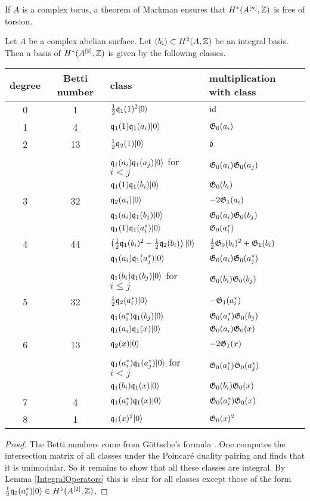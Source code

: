 \begin{remark}
If $A$ is a complex torus, a theorem of Markman \cite{Markman} ensures that $H^*(A^{[n]},\mathbb{Z})$ is free of torsion.
\end{remark} 

\begin{proposition} \label{A2Basis}
Let $A$ be a complex abelian surface. Let $(b_i)\subset H^2(A,\mathbb{Z})$ be an integral basis. Then a basis of $H^*(A^{[2]},\mathbb{Z})$ is given by the following classes.
\begin{center}
\begin{tabular}{c|c|l|l}
 degree & Betti number & class & multiplication with class \\\hline
 0 & 1 & $\frac{1}{2}\mathfrak{q}_1(1)^2|0\rangle$ & $\operatorname{id}$ \\ \hline
 1 & 4 &  $\mathfrak{q}_1(1)\mathfrak{q}_1(a_i)|0\rangle$ & $\mathfrak{G}_0(a_i)$ \\ \hline
 2 & 13 & $\frac{1}{2}\mathfrak{q}_2(1)|0\rangle$ & $\mathfrak{d}$ \\ 
   &  & $\mathfrak{q}_1(a_i)\mathfrak{q}_1(a_j)|0\rangle$ for $i<j$ & $\mathfrak{G}_0(a_i)\mathfrak{G}_0(a_j)$ \\
   &  & $\mathfrak{q}_1(1)\mathfrak{q}_1(b_i)|0\rangle$ & $\mathfrak{G}_0(b_i)$ \\\hline
 3 & 32 & $\mathfrak{q}_2(a_i)|0\rangle$  & $-2\mathfrak{G}_1(a_i) $ \\
   &  & $\mathfrak{q}_1(a_i)\mathfrak{q}_1(b_j)|0\rangle$ & $\mathfrak{G}_0(a_i)\mathfrak{G}_0(b_j)$ \\ 
   &  & $\mathfrak{q}_1(1)\mathfrak{q}_1(a^*_i)|0\rangle$ & $\mathfrak{G}_0(a^*_i)$ \\\hline
 4 & 44 & $\left(\frac{1}{2}\mathfrak{q}_1(b_i)^2-\frac{1}{2}\mathfrak{q}_2(b_i)\right)|0\rangle$ & $\frac{1}{2} \mathfrak{G}_0(b_i)^2 + \mathfrak{G}_1(b_i) $ \\
   &  & $\mathfrak{q}_1(a_i)\mathfrak{q}_1(a^*_j)|0\rangle$ & $\mathfrak{G}_0(a_i)\mathfrak{G}_0(a^*_j)$ \\
   &  & $ \mathfrak{q}_1(b_i)\mathfrak{q}_1(b_j)|0\rangle$ for $i\leq j$ &  $\mathfrak{G}_0(b_i)\mathfrak{G}_0(b_j)$ \\\hline
 5 & 32 & $\frac{1}{2}\mathfrak{q}_2(a^*_i)|0\rangle$ & $-\mathfrak{G}_1(a^*_i)$ \\
   &  & $\mathfrak{q}_1(a^*_i)\mathfrak{q}_1(b_j)|0\rangle$ & $ \mathfrak{G}_0(a^*_i)\mathfrak{G}_0(b_j)$ \\
   &  & $\mathfrak{q}_1(a_i)\mathfrak{q}_1(x)|0\rangle$ & $\mathfrak{G}_0(a_i)\mathfrak{G}_0(x)$ \\\hline
 6 & 13 & $\mathfrak{q}_2(x)|0\rangle$ & $-2\mathfrak{G}_1(x)$ \\
   &  & $\mathfrak{q}_1(a^*_i)\mathfrak{q}_1(a^*_j)|0\rangle$ for $i<j$ & $\mathfrak{G}_0(a^*_i)\mathfrak{G}_0(a^*_j)$ \\
   &  & $\mathfrak{q}_1(b_i)\mathfrak{q}_1(x)|0\rangle$ & $ \mathfrak{G}_0(b_i)\mathfrak{G}_0(x)$ \\\hline
 7 & 4 & $\mathfrak{q}_1(a^*_i)\mathfrak{q}_1(x)|0\rangle$ & $\mathfrak{G}_0(a^*_i)\mathfrak{G}_0(x) $ \\\hline
 8 & 1 & $\mathfrak{q}_1(x)^2|0\rangle$ & $\mathfrak{G}_0(x)^2$ 
\end{tabular}
\end{center}
\begin{proof}
The Betti numbers come from G\"ottsche's formula \cite{Gottsche}.
One computes the intersection matrix of all classes under the Poincar\'e duality pairing and finds that it is unimodular. 
So it remains to show that all these classes are integral. By Lemma \ref{IntegralOperators} this is clear for all classes except 
those of the form $\frac{1}{2}\mathfrak{q}_2(a^*_i)|0\rangle \in H^5(A^{[2]},\mathbb{Z})$.


\end{proof}
\end{proposition}
